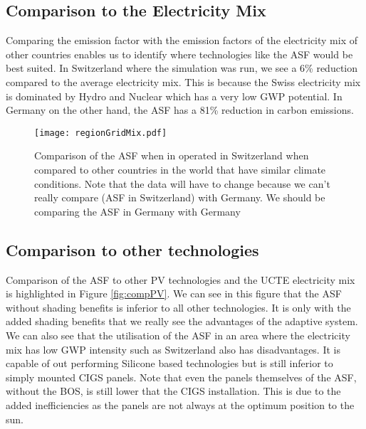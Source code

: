 
\subsection{Comparison to the Electricity Mix}
\label{ch:elecMix}

Comparing the emission factor with the emission factors of the electricity mix of other countries enables us to identify where technologies like the ASF would be best suited. In Switzerland where the simulation was run, we see a 6\% reduction compared to the average electricity mix. This is because the Swiss electricity mix is dominated by Hydro and Nuclear which has a very low GWP potential. In Germany on the other hand, the ASF has a 81\% reduction in carbon emissions. \\

\begin{figure}[H]
\begin{center}
\texttt{[image: regionGridMix.pdf]}
\caption{Comparison of the ASF when in operated in Switzerland when compared to other countries in the world that have similar climate conditions. Note that the data will have to change because we can't really compare (ASF in Switzerland) with Germany. We should be comparing the ASF in Germany with Germany}
\label{fig:compReg}
\end{center}
\end{figure}


\subsection{Comparison to other technologies}

Comparison of the ASF to other PV technologies and the UCTE electricity mix is highlighted in Figure \ref{fig:compPV}. We can see in this figure that the ASF without shading benefits is inferior to all other technologies. It is only with the added shading benefits that we really see the advantages of the adaptive system.
We can also see that the utilisation of the ASF in an area where the electricity mix has low GWP intensity such as Switzerland also has disadvantages. It is capable of out performing Silicone based technologies but is still inferior to simply mounted CIGS panels. Note that even the panels themselves of the ASF, without the BOS, is still lower that the CIGS installation. This is due to the added inefficiencies as the panels are not always at the optimum position to the sun.


